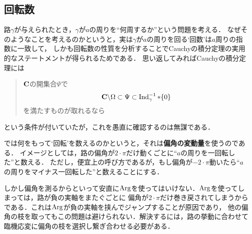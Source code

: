 \subsection{回転数}
	
	路$\gamma$が与えられたとき，$\gamma$が$a$の周りを``何周するか''という問題を考える．
	なぜそのようなことを考えるのかというと，実は$\gamma$が$a$の周りを回る`回数'は$a$周りの指数に一致して，
	しかも回転数の性質を分析することでCauchyの積分定理の実用的なステートメントが得られるためである．
	思い返してみればCauchyの積分定理には
	\begin{quote}
		$\mathbf{C}$の開集合$\Psi$で
		\begin{align}
			\mathbf{C} \backslash \Omega \subset \Psi \subset \operatorname{Ind}_{\gamma}^{-1} \ast \{0\}
		\end{align}
		を満たすものが取れるなら
	\end{quote}
	という条件が付いていたが，これを愚直に確認するのは無謀である．
	
	では何をもって`回転'を数えるのかというと，それは{\bf 偏角の変動量}を使うのである．
	イメージとしては，路の偏角が$2 \cdot \pi$だけ動くごとに``$a$の周りを一回転した''と数える．
	ただし，便宜上の呼び方であるが，もし偏角が$-2\cdot\pi$動いたら``$a$の周りをマイナス一回転した''と数えることにする．
	
	\begin{center}
	\end{center}
	
	しかし偏角を測るからといって安直に$\operatorname{Arg}$を使ってはいけない．$\operatorname{Arg}$を使ってしまっては，路が負の実軸をまたぐごとに
	偏角が$2 \cdot \pi$だけ巻き戻されてしまうからである．これは$\operatorname{Arg}$が負の実軸を挟んでジャンプすることが原因であり，
	他の偏角の枝を取ってもこの問題は避けられない．解決するには，路の挙動に合わせて臨機応変に偏角の枝を選択し繋ぎ合わせる必要がある．
	
